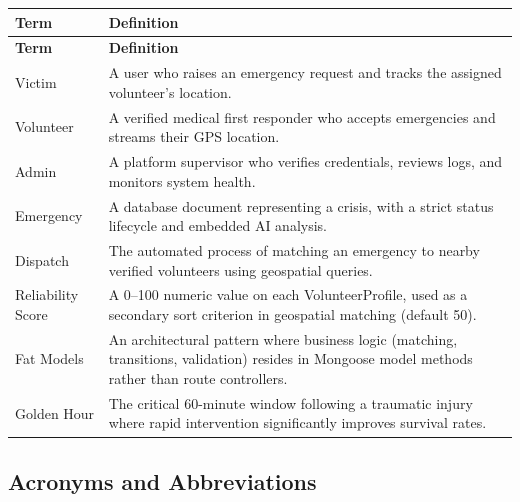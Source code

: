 \documentclass[12pt,a4paper]{article}
\begin{document}
\begin{longtable}{|p{3.5cm}|p{10.5cm}|}
\hline
\rowcolor{lightorange}
\textbf{Term} & \textbf{Definition} \\
\hline
\endfirsthead
\hline
\rowcolor{lightorange}
\textbf{Term} & \textbf{Definition} \\
\hline
\endhead

Victim & A user who raises an emergency request and tracks the assigned volunteer's location. \\
\hline
Volunteer & A verified medical first responder who accepts emergencies and streams their GPS location. \\
\hline
Admin & A platform supervisor who verifies credentials, reviews logs, and monitors system health. \\
\hline
Emergency & A database document representing a crisis, with a strict status lifecycle and embedded AI analysis. \\
\hline
Dispatch & The automated process of matching an emergency to nearby verified volunteers using geospatial queries. \\
\hline
Reliability Score & A 0--100 numeric value on each VolunteerProfile, used as a secondary sort criterion in geospatial matching (default 50). \\
\hline
Fat Models & An architectural pattern where business logic (matching, transitions, validation) resides in Mongoose model methods rather than route controllers. \\
\hline
Golden Hour & The critical 60-minute window following a traumatic injury where rapid intervention significantly improves survival rates. \\
\hline

\end{longtable}

\subsection{Acronyms and Abbreviations}
\end{document}
